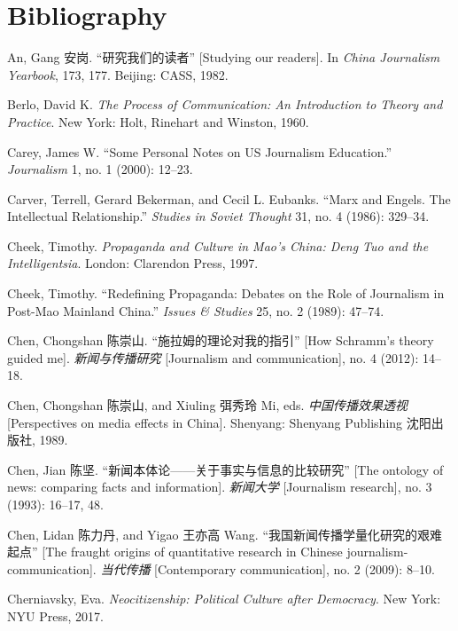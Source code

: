 \documentclass{tufte-handout}
\begin{document}
\section{Bibliography}\label{bibliography}

\begin{hangparas}{.25in}{1} 

\begin{CJK*}{UTF8}{gbsn}

An, Gang 安岗. ``研究我们的读者'' {[}Studying our readers{]}. In
\emph{China Journalism Yearbook}, 173, 177. Beijing: CASS, 1982.

Berlo, David K. \emph{The Process of Communication: An Introduction to
Theory and Practice}. New York: Holt, Rinehart and Winston, 1960.

Carey, James W. ``Some Personal Notes on US Journalism Education.''
\emph{Journalism} 1, no. 1 (2000): 12--23.

Carver, Terrell, Gerard Bekerman, and Cecil L. Eubanks. ``Marx and
Engels. The Intellectual Relationship.'' \emph{Studies in Soviet
Thought} 31, no. 4 (1986): 329--34.

Cheek, Timothy. \emph{Propaganda and Culture in Mao's China: Deng Tuo
and the Intelligentsia}. London: Clarendon Press, 1997.

Cheek, Timothy. ``Redefining Propaganda: Debates on the Role of
Journalism in Post-Mao Mainland China.'' \emph{Issues \& Studies} 25,
no. 2 (1989): 47--74.

Chen, Chongshan 陈崇山. ``施拉姆的理论对我的指引'' {[}How Schramm's
theory guided me{]}. \emph{新闻与传播研究} {[}Journalism and
communication{]}, no. 4 (2012): 14--18.

Chen, Chongshan 陈崇山, and Xiuling 弭秀玲 Mi, eds.
\emph{中国传播效果透视} {[}Perspectives on media effects in China{]}.
Shenyang: Shenyang Publishing 沈阳出版社, 1989.

Chen, Jian 陈坚. ``新闻本体论------关于事实与信息的比较研究'' {[}The
ontology of news: comparing facts and information{]}. \emph{新闻大学}
{[}Journalism research{]}, no. 3 (1993): 16--17, 48.

Chen, Lidan 陈力丹, and Yigao 王亦高 Wang.
``我国新闻传播学量化研究的艰难起点'' {[}The fraught origins of
quantitative research in Chinese journalism-communication{]}.
\emph{当代传播} {[}Contemporary communication{]}, no. 2 (2009): 8--10.

Cherniavsky, Eva. \emph{Neocitizenship: Political Culture after
Democracy}. New York: NYU Press, 2017.


\end{CJK*}
\end{hangparas}
\end{document}
